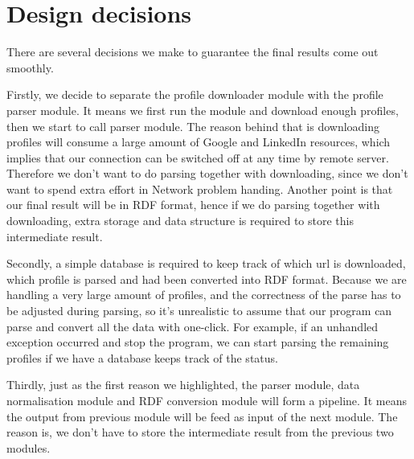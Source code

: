 \section{Design decisions}

There are several decisions we make to guarantee the final results come out smoothly.

Firstly, we decide to separate the profile downloader module with the profile parser module. It means we first run the module and download enough profiles, then we start to call parser module. The reason behind that is downloading profiles will consume a large amount of Google and LinkedIn resources, which implies that our connection can be switched off at any time by remote server. Therefore we don't want to do parsing together with downloading, since we don't want to spend extra effort in Network problem handing. Another point is that our final result will be in RDF format, hence if we do parsing together with downloading, extra storage and data structure is required to store this intermediate result.

Secondly, a simple database is required to keep track of which url is downloaded, which profile is parsed and had been converted into RDF format. Because we are handling a very large amount of profiles, and the correctness of the parse has to be adjusted during parsing, so it's unrealistic to assume that our program can parse and convert all the data with one-click. For example, if an unhandled exception occurred and stop the program, we can start parsing the remaining profiles if we have a database keeps track of the status.

Thirdly, just as the first reason we highlighted, the parser module, data normalisation module and RDF conversion module will form a pipeline. It means the output from previous module will be feed as input of the next module. The reason is, we don't have to store the intermediate result from the previous two modules.
